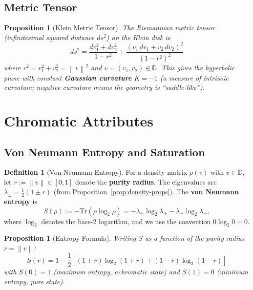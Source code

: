 \documentclass[11pt]{article}
\theoremstyle{plain}
\newtheorem{proposition}[theorem]{Proposition}
\theoremstyle{definition}
\newtheorem{definition}[theorem]{Definition}
\theoremstyle{remark}
\newcommand{\D}{\mathbb{D}}
\newcommand{\norm}[1]{\left\lVert #1 \right\rVert}
\newcommand{\Tr}{\mathrm{Tr}}
\begin{document}
\subsection{Metric Tensor}

\begin{proposition}[Klein Metric Tensor]
The Riemannian metric tensor (infinitesimal squared distance $ds^2$) on the Klein disk is
\begin{equation}
ds^2 = \frac{dv_1^2 + dv_2^2}{1 - r^2} + \frac{(v_1 \, dv_1 + v_2 \, dv_2)^2}{(1 - r^2)^2}
\end{equation}
where $r^2 = v_1^2 + v_2^2 = \norm{v}^2$ and $v = (v_1, v_2) \in \D$. This gives the hyperbolic plane with constant \textbf{Gaussian curvature} $K = -1$ (a measure of intrinsic curvature; negative curvature means the geometry is ``saddle-like'').
\end{proposition}

\section{Chromatic Attributes}
\label{sec:attributes}

\subsection{Von Neumann Entropy and Saturation}

\begin{definition}[Von Neumann Entropy]
For a density matrix $\rho(v)$ with $v \in \bar{\D}$, let $r := \norm{v} \in [0, 1]$ denote the \textbf{purity radius}. The eigenvalues are $\lambda_\pm = \frac{1}{2}(1 \pm r)$ (from Proposition~\ref{prop:density-props}). The \textbf{von Neumann entropy} is
\begin{equation}
S(\rho) := -\Tr(\rho \log_2 \rho) = -\lambda_+ \log_2 \lambda_+ - \lambda_- \log_2 \lambda_-,
\end{equation}
where $\log_2$ denotes the base-2 logarithm, and we use the convention $0 \log_2 0 = 0$.
\end{definition}

\begin{proposition}[Entropy Formula]
Writing $S$ as a function of the purity radius $r = \norm{v}$:
\begin{equation}
\boxed{
S(r) = 1 - \frac{1}{2}\left[ (1+r)\log_2(1+r) + (1-r)\log_2(1-r) \right]
}
\end{equation}
with $S(0) = 1$ (maximum entropy, achromatic state) and $S(1) = 0$ (minimum entropy, pure state).
\end{proposition}
\end{document}
